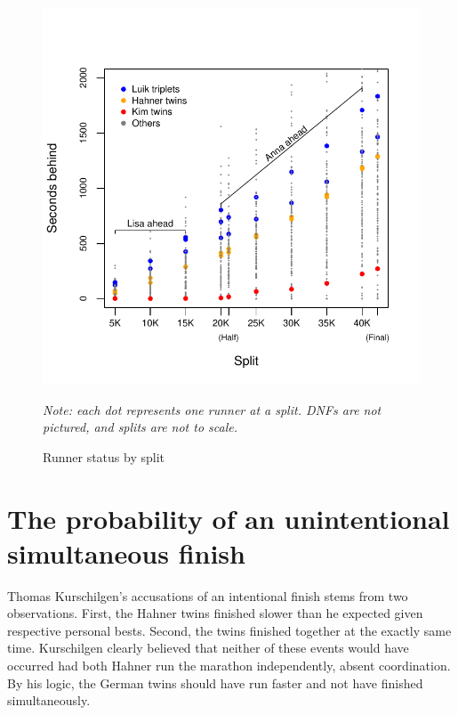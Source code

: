 \documentclass[12pt,titlepage]{article}
\begin{document}
\begin{figure}[!ht]
  \centering
  \caption{Runner status by split}
  \label{fig:secondsbehind}
  \includegraphics[scale = 1]{seconds-behind.pdf}
  \begin{flushleft}
    \emph{Note: each dot represents one runner at a split.  DNFs are
      not pictured, and splits are not to scale.}
  \end{flushleft}
\end{figure}


\section*{The probability of an unintentional simultaneous finish}

Thomas Kurschilgen's accusations of an intentional finish stems from
two observations. First, the Hahner twins finished slower than he
expected given respective personal bests. Second, the twins finished
together at the exactly same time. Kurschilgen clearly believed that
neither of these events would have occurred had both Hahner run the
marathon independently, absent coordination. By his logic, the German
twins should have run faster and not have finished simultaneously.
\end{document}
